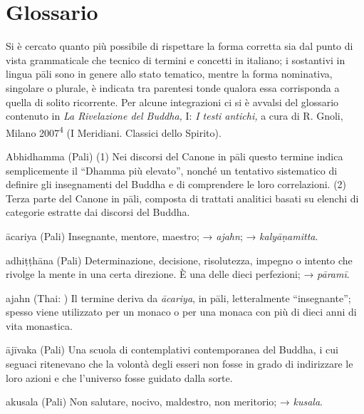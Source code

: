 \chapter{Glossario}

Si è cercato quanto più possibile di rispettare la forma corretta sia
dal punto di vista grammaticale che tecnico di termini e concetti in
italiano; i sostantivi in lingua pāli sono in genere allo stato
tematico, mentre la forma nominativa, singolare o plurale, è indicata
tra parentesi tonde qualora essa corrisponda a quella di solito
ricorrente. Per alcune integrazioni ci si è avvalsi del glossario
contenuto in \emph{La Rivelazione del Buddha,} I: \emph{I testi
antichi,} a cura di R. Gnoli, Milano 2007\textsuperscript{4} (I
Meridiani. Classici dello Spirito).

\begin{glossarydescription}


\item[Abhidhamma] (Pali) (1) Nei discorsi del Canone in pāli questo termine
indica semplicemente il ``Dhamma più elevato'', nonché un tentativo
sistematico di definire gli insegnamenti del Buddha e di comprendere le
loro correlazioni. (2) Terza parte del Canone in pāli, composta di
trattati analitici basati su elenchi di categorie estratte dai discorsi
del Buddha.

\item[ācariya] (Pali) Insegnante, mentore, maestro; → \emph{ajahn}; →
\emph{kalyāṇamitta}.

\item[adhiṭṭhāna] (Pali) Determinazione, decisione, risolutezza, impegno o
intento che rivolge la mente in una certa direzione. È una delle dieci
perfezioni; → \emph{pāramī}.

\item[ajahn] (Thai: ) Il
termine deriva da \emph{ācariya}, in pāli, letteralmente ``insegnante'';
spesso viene utilizzato per un monaco o per una monaca con più di dieci
anni di vita monastica.

\item[ājīvaka] (Pali) Una scuola di contemplativi contemporanea del Buddha, i
cui seguaci ritenevano che la volontà degli esseri non fosse in grado di
indirizzare le loro azioni e che l'universo fosse guidato dalla sorte.

\item[akusala] (Pali) Non salutare, nocivo, maldestro, non meritorio; →
\emph{kusala}.


\end{glossarydescription}
